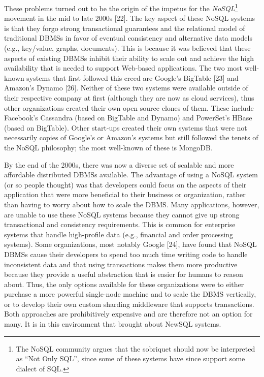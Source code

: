 \documentclass[a4paper,11pt,twoside,openright]{article}
\begin{document}
These problems turned out to be the origin of the impetus for the
\emph{NoSQL}\footnote{The NoSQL community argues that the sobriquet
  should now be interpreted as ``Not Only SQL'', since some of these
  systems have since support some dialect of SQL.} movement in the mid
to late 2000s {[}22{]}. The key aspect of these NoSQL systems is that
they forgo strong transactional guarantees and the relational model of
traditional DBMSs in favor of eventual consistency and alternative data
models (e.g., key/value, graphs, documents). This is because it was
believed that these aspects of existing DBMSs inhibit their ability to
scale out and achieve the high availability that is needed to support
Web-based applications. The two most well-known systems that first
followed this creed are Google's BigTable {[}23{]} and Amazon's Dynamo
{[}26{]}. Neither of these two systems were available outside of their
respective company at first (although they are now as cloud services),
thus other organizations created their own open source clones of them.
These include Facebook's Cassandra (based on BigTable and Dynamo) and
PowerSet's HBase (based on BigTable). Other start-ups created their own
systems that were not necessarily copies of Google's or Amazon's systems
but still followed the tenets of the NoSQL philosophy; the most
well-known of these is MongoDB.

By the end of the 2000s, there was now a diverse set of scalable and
more affordable distributed DBMSs available. The advantage of using a
NoSQL system (or so people thought) was that developers could focus on
the aspects of their application that were more beneficial to their
business or organization, rather than having to worry about how to scale
the DBMS. Many applications, however, are unable to use these NoSQL
systems because they cannot give up strong transactional and consistency
requirements. This is common for enterprise systems that handle
high-profile data (e.g., financial and order processing systems). Some
organizations, most notably Google {[}24{]}, have found that NoSQL DBMSs
cause their developers to spend too much time writing code to handle
inconsistent data and that using transactions makes them more productive
because they provide a useful abstraction that is easier for humans to
reason about. Thus, the only options available for these organizations
were to either purchase a more powerful single-node machine and to scale
the DBMS vertically, or to develop their own custom sharding middleware
that supports transactions. Both approaches are prohibitively expensive
and are therefore not an option for many. It is in this environment that
brought about NewSQL systems.
\end{document}
